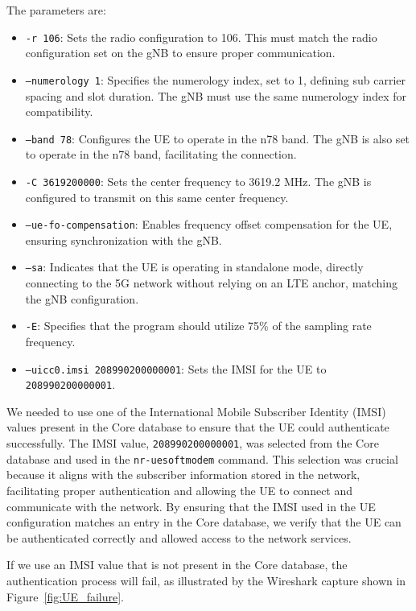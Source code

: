 The parameters are:

\begin{itemize}
    \item \texttt{-r 106}: Sets the radio configuration to 106.
    This must match the radio configuration set on the gNB to ensure proper communication.
    \item \texttt{--numerology 1}: Specifies the numerology index, set to 1, defining sub carrier spacing and slot duration.
    The gNB must use the same numerology index for compatibility.
    \item \texttt{--band 78}: Configures the UE to operate in the n78 band.
    The gNB is also set to operate in the n78 band, facilitating the connection.
    \item \texttt{-C 3619200000}: Sets the center frequency to 3619.2 MHz. The gNB is configured to transmit on this same center frequency.
    \item \texttt{--ue-fo-compensation}: Enables frequency offset compensation for the UE, ensuring synchronization with the gNB.
    \item \texttt{--sa}: Indicates that the UE is operating in standalone mode, directly connecting to the 5G network without relying on an LTE anchor, matching the gNB configuration.
    \item \texttt{-E}: Specifies that the program should utilize 75\% of the sampling rate frequency.
    \item \texttt{--uicc0.imsi 208990200000001}: Sets the IMSI for the UE to \texttt{208990200000001}.
\end{itemize}

We needed to use one of the International Mobile Subscriber Identity (IMSI) values present in the Core database to ensure that the UE could authenticate successfully.
The IMSI value, \texttt{208990200000001}, was selected from the Core database and used in the \texttt{nr-uesoftmodem} command.
This selection was crucial because it aligns with the subscriber information stored in the network, facilitating proper authentication and allowing the UE to connect and communicate with the network.
By ensuring that the IMSI used in the UE configuration matches an entry in the Core database, we verify that the UE can be authenticated correctly and allowed access to the network services.

If we use an IMSI value that is not present in the Core database, the authentication process will fail, as illustrated by the Wireshark capture shown in Figure~\ref{fig:UE_failure}.

